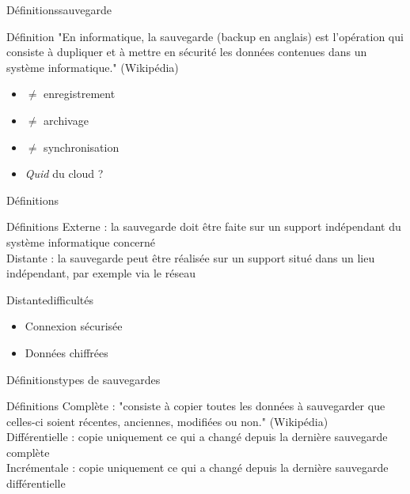 \documentclass[12pt]{beamer}
\begin{document}
		\begin{frame}{Définitions}{sauvegarde}
			\begin{exampleblock}{Définition}
				"En informatique, la \alert{sauvegarde} (backup en anglais) est l'opération qui consiste à dupliquer 
				et à mettre en sécurité les données contenues dans un système informatique." (Wikipédia)
			\end{exampleblock}	
			\begin{itemize}
				\item $\neq$ enregistrement
				\item $\neq$ archivage
				\item $\neq$ synchronisation
				\item \textit{Quid} du cloud ?
			\end{itemize}		
		\end{frame}
		
		\begin{frame}{Définitions}
			\begin{exampleblock}{Définitions}
				\alert{Externe} : la sauvegarde doit être faite sur un support indépendant du système informatique concerné \\
				\alert{Distante} : la sauvegarde peut être réalisée sur un support situé dans un lieu indépendant, par exemple via le réseau
			\end{exampleblock}
		\end{frame}
		
		\begin{frame}{Distante}{difficultés}
			\begin{itemize}
				\item Connexion sécurisée
				\item Données chiffrées
			\end{itemize}		
		\end{frame}
		
		\begin{frame}{Définitions}{types de sauvegardes}
			\begin{exampleblock}{Définitions}
				\alert{Complète} : "consiste à copier toutes les données à sauvegarder que celles-ci soient récentes, anciennes, modifiées ou non." (Wikipédia) \\
				\alert{Différentielle} : copie uniquement ce qui a changé depuis la dernière sauvegarde complète \\
				\alert{Incrémentale} : copie uniquement ce qui a changé depuis la dernière sauvegarde différentielle
			\end{exampleblock}
		\end{frame}
		
\end{document}
